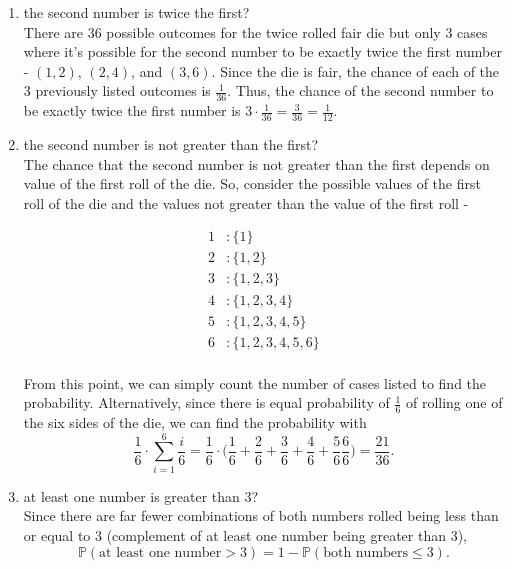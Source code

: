 \documentclass[12pt]{article}
\begin{document}
\begin{center}
\begin{enumerate}[label=(\alph*)]

\item the second number is twice the first? \\
\vspace{.3cm}
\noindent
There are $36$ possible outcomes for the twice rolled fair die but only $3$ cases where it's possible for the second number to be exactly twice the first number - $(1,2)$, $(2,4)$, and $(3,6)$. Since the die is fair, the chance of each of the $3$ previously listed outcomes is $\frac{1}{36}$. Thus, the chance of the second number to be exactly twice the first number is $3 \cdot \frac{1}{36} = \frac{3}{36} = \frac{1}{12}$.

\item the second number is not greater than the first? \\
\vspace{.3cm}
\noindent
The chance that the second number is not greater than the first depends on value of the first roll of the die. So, consider the possible values of the first roll of the die and the values not greater than the value of the first roll - 

\begin{align*}
 1 &: \{ 1 \} \\
 2 &: \{ 1,2 \} \\
 3 &: \{ 1,2,3 \} \\
 4 &: \{ 1,2,3,4 \} \\
 5 &: \{ 1,2,3,4,5 \} \\
 6 &: \{ 1,2,3,4,5,6 \} \\
\end{align*}

\noindent
From this point, we can simply count the number of cases listed to find the probability. Alternatively, since there is equal probability of $\frac{1}{6}$ of rolling one of the six sides of the die, we can find the probability with
\begin{equation*}
\frac{1}{6} \cdot \sum_{i=1}^{6} \frac{i}{6} = \frac{1}{6} \cdot \big ( \frac{1}{6} + \frac{2}{6} + \frac{3}{6} + \frac{4}{6} + \frac{5}{6} \frac{6}{6} \big ) = \frac{21}{36}.
\end{equation*}

\item at least one number is greater than $3$? \\
\vspace{.3cm}
\noindent
Since there are far fewer combinations of both numbers rolled being less than or equal to $3$ (complement of at least one number being greater than $3$), 
\begin{equation*}
\mathbb{P}(\text{at least one number} > 3) = 1 - \mathbb{P}(\text{both numbers} \leq 3).
\end{equation*}


\end{enumerate}
\end{center}
\end{document}
